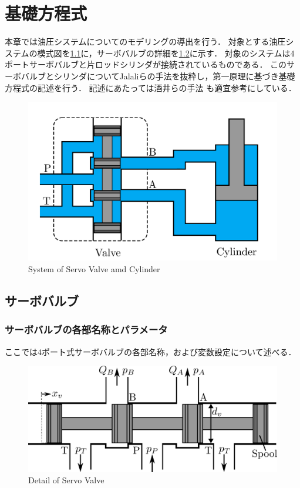 \chapter{基礎方程式}
\label{sec:FundamentalEquation}
本章では油圧システムについてのモデリングの導出を行う．
対象とする油圧システムの模式図を\figname\ref{fig:valve-cylinder}に，サーボバルブの詳細を\figname\ref{fig:valve}に示す．
対象のシステムは4ポートサーボバルブと片ロッドシリンダが接続されているものである．
このサーボバルブとシリンダについてJalaliら\cite{jelali2012hydraulic}の手法を抜粋し，第一原理に基づき基礎方程式の記述を行う．
記述にあたっては酒井らの手法\cite{前島祐三2011,前島祐三2014} も適宜参考にしている．
\begin{figure}[t]
    \centering
        \includegraphics[keepaspectratio, scale=1.0]{contents/FundamentalEquation/figure/valve-cylinder.png}
        \caption{System of Servo Valve amd Cylinder}
        \label{fig:valve-cylinder}
\end{figure}

\section{サーボバルブ}
\subsection{サーボバルブの各部名称とパラメータ}
ここでは4ポート式サーボバルブの各部名称，および変数設定について述べる．
\begin{figure}[t]
    \centering
        \includegraphics[keepaspectratio, scale=1.0]{contents/FundamentalEquation/figure/valve.png}
        \caption{Detail of Servo Valve}
        \label{fig:valve}
\end{figure}
